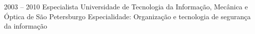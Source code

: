 


\begin{entrylist}
    \entry
    {2003 -- 2010}
    {Especialista}
    {Universidade de Tecnologia da Informação, Mecânica e Óptica de São Petersburgo}
    {Especialidade: Organização e tecnologia de segurança da informação}
\end{entrylist}
